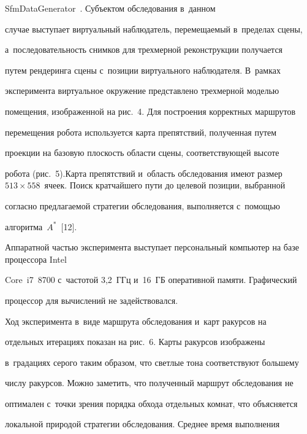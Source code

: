  

  \noindent

   SfmDataGenerator~\cite{11-ya}. Субъектом обследования в~данном 

случае вы\-ступает виртуальный наблюдатель, перемещаемый в~пределах сцены, 

а~последовательность снимков для трехмерной реконструкции получается 

путем рендеринга сцены с~позиции виртуального наблюдателя. В~рамках 

эксперимента виртуальное окружение представлено трехмерной моделью 

помещения, изображенной на рис.~4. Для построения корректных маршрутов 

перемещения робота используется карта препятствий, полученная путем 

проекции на базовую плоскость области сцены, соответствующей высоте 

робота (рис.~5).\linebreak Карта препятствий и~область обследования имеют размер $513 

\times 558$~ячеек. Поиск кратчайшего пути до целе\-вой позиции, выбранной 

согласно предлагаемой стратегии обследования, выполняется с~по\-мощью 

алгоритма~$A^*$~[12].

  

  Аппаратной частью эксперимента выступает персональный компьютер на базе процессора Intel 

Core~i7~8700 с~частотой 3,2~ГГц и~16~ГБ оперативной памяти. Графический 

процессор для вычислений не задействовался.

  

  

  

  Ход эксперимента в~виде маршрута обследования и~карт ракурсов на 

отдельных итерациях показан на рис.~6. Карты ракурсов изображены 

в~градациях серого таким образом, что светлые тона соответствуют большему 

числу ракурсов. Можно заметить, что полученный маршрут обследования не 

оптимален с~точки зрения порядка обхода отдельных комнат, что объясняется 

локальной природой стратегии обследования. Среднее время выполнения 


